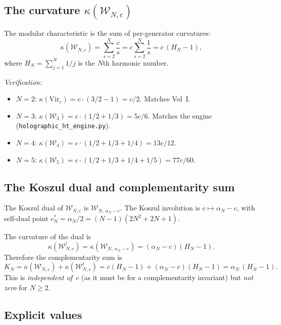 \documentclass[11pt]{article}
\newcommand{\cW}{\mathcal{W}}
\begin{document}
\subsection*{The curvature $\kappa(\cW_{N,c})$}

The modular characteristic is the sum of per-generator curvatures:
\begin{equation}\label{eq:kappa-wn-formula}
\kappa(\cW_{N,c})
= \sum_{s=2}^{N} \frac{c}{s}
= c \sum_{s=2}^{N} \frac{1}{s}
= c\,(H_N - 1),
\end{equation}
where $H_N = \sum_{j=1}^{N} 1/j$ is the $N$th harmonic number.

\emph{Verification:}
\begin{itemize}[leftmargin=1.8em]
\item $N=2$: $\kappa(\mathrm{Vir}_c) = c \cdot (3/2 - 1) = c/2$.
  Matches Vol~I.
\item $N=3$: $\kappa(\cW_3) = c \cdot (1/2 + 1/3) = 5c/6$.
  Matches the engine (\texttt{holographic\_ht\_engine.py}).
\item $N=4$: $\kappa(\cW_4) = c \cdot (1/2 + 1/3 + 1/4) = 13c/12$.
\item $N=5$: $\kappa(\cW_5) = c \cdot (1/2 + 1/3 + 1/4 + 1/5) = 77c/60$.
\end{itemize}

\subsection*{The Koszul dual and complementarity sum}

The Koszul dual of $\cW_{N,c}$ is $\cW_{N,\,\alpha_N - c}$.
The Koszul involution is $c \mapsto \alpha_N - c$, with self-dual point
$c^*_N = \alpha_N / 2 = (N-1)(2N^2 + 2N + 1)$.

The curvature of the dual is
\[
\kappa(\cW_{N,c}^!)
= \kappa(\cW_{N,\,\alpha_N - c})
= (\alpha_N - c)(H_N - 1).
\]
Therefore the complementarity sum is
\begin{equation}\label{eq:kn-formula}
\boxed{
K_N
= \kappa(\cW_{N,c}) + \kappa(\cW_{N,c}^!)
= c(H_N - 1) + (\alpha_N - c)(H_N - 1)
= \alpha_N\,(H_N - 1).
}
\end{equation}
This is \emph{independent of~$c$} (as it must be for a
complementarity invariant) but \emph{not zero} for $N \ge 2$.

\subsection*{Explicit values}
\end{document}
